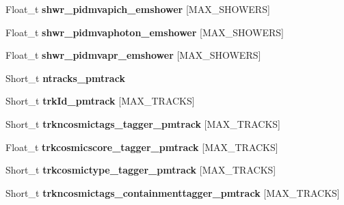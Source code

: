 \begin{DoxyCompactItemize}
\item 
\hypertarget{classanatree_af75e1f3fdf9bde31f05fe50528f70780}{Float\-\_\-t {\bfseries shwr\-\_\-pidmvapich\-\_\-emshower} \mbox{[}M\-A\-X\-\_\-\-S\-H\-O\-W\-E\-R\-S\mbox{]}}\label{classanatree_af75e1f3fdf9bde31f05fe50528f70780}

\item 
\hypertarget{classanatree_a736dd41a0716c661ec1ffe5ec1124dce}{Float\-\_\-t {\bfseries shwr\-\_\-pidmvaphoton\-\_\-emshower} \mbox{[}M\-A\-X\-\_\-\-S\-H\-O\-W\-E\-R\-S\mbox{]}}\label{classanatree_a736dd41a0716c661ec1ffe5ec1124dce}

\item 
\hypertarget{classanatree_a4eb600b604c899bc84335d6bced8e714}{Float\-\_\-t {\bfseries shwr\-\_\-pidmvapr\-\_\-emshower} \mbox{[}M\-A\-X\-\_\-\-S\-H\-O\-W\-E\-R\-S\mbox{]}}\label{classanatree_a4eb600b604c899bc84335d6bced8e714}

\item 
\hypertarget{classanatree_a8cd01b78cf453dae76434d5aa9e0d2a5}{Short\-\_\-t {\bfseries ntracks\-\_\-pmtrack}}\label{classanatree_a8cd01b78cf453dae76434d5aa9e0d2a5}

\item 
\hypertarget{classanatree_a5db3ef8f3ce987b9359f6f2c0be8c9b7}{Short\-\_\-t {\bfseries trk\-Id\-\_\-pmtrack} \mbox{[}M\-A\-X\-\_\-\-T\-R\-A\-C\-K\-S\mbox{]}}\label{classanatree_a5db3ef8f3ce987b9359f6f2c0be8c9b7}

\item 
\hypertarget{classanatree_a6e90e245b33c9df0d46d3ce8ed97a291}{Short\-\_\-t {\bfseries trkncosmictags\-\_\-tagger\-\_\-pmtrack} \mbox{[}M\-A\-X\-\_\-\-T\-R\-A\-C\-K\-S\mbox{]}}\label{classanatree_a6e90e245b33c9df0d46d3ce8ed97a291}

\item 
\hypertarget{classanatree_a856fef9df06a4d333839520c67a554b0}{Float\-\_\-t {\bfseries trkcosmicscore\-\_\-tagger\-\_\-pmtrack} \mbox{[}M\-A\-X\-\_\-\-T\-R\-A\-C\-K\-S\mbox{]}}\label{classanatree_a856fef9df06a4d333839520c67a554b0}

\item 
\hypertarget{classanatree_ae01a6e74143af9a7820cdc20b2054555}{Short\-\_\-t {\bfseries trkcosmictype\-\_\-tagger\-\_\-pmtrack} \mbox{[}M\-A\-X\-\_\-\-T\-R\-A\-C\-K\-S\mbox{]}}\label{classanatree_ae01a6e74143af9a7820cdc20b2054555}

\item 
\hypertarget{classanatree_a044131062eaf456813e635cfb3612696}{Short\-\_\-t {\bfseries trkncosmictags\-\_\-containmenttagger\-\_\-pmtrack} \mbox{[}M\-A\-X\-\_\-\-T\-R\-A\-C\-K\-S\mbox{]}}\label{classanatree_a044131062eaf456813e635cfb3612696}


\end{DoxyCompactItemize}
